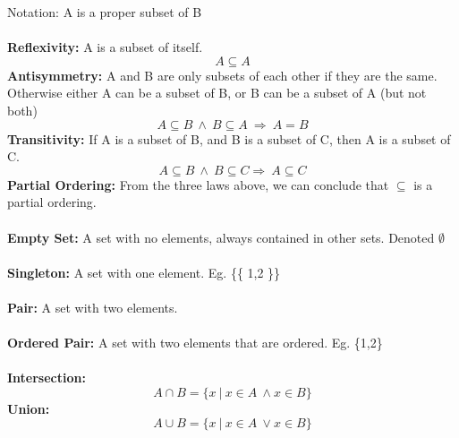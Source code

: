 \documentclass[a4paper,10pt]{article}
\begin{document}
\textcolor{BlueGreen}{Notation:} A is a proper subset of B \\\\
\textcolor{BlueGreen}{\textbf{Reflexivity:}} A is a subset of itself. \\
\begin{equation*}
A \subseteq A
\end{equation*}
\newline
\textcolor{BlueGreen}{\textbf{Antisymmetry:}} A and B are only subsets of each other if they are the same. Otherwise either A can be a subset of B, or B can be a subset of A (but not both) \\
\begin{equation*}
A \subseteq B \ \land \ B \subseteq A \ \Rightarrow \ A = B
\end{equation*}
\newline
\textcolor{BlueGreen}{\textbf{Transitivity:}} If A is a subset of B, and B is a subset of C, then A is a subset of C.  \\
\begin{equation*}
A \subseteq B \ \land \  B \subseteq C \Rightarrow \ A \subseteq C
\end{equation*}
\newline
\textcolor{BlueGreen}{\textbf{Partial Ordering:}} From the three laws above, we can conclude that $\subseteq$ is a partial ordering. \\\\
\textcolor{BlueGreen}{\textbf{Empty Set:}} A set with no elements, always contained in other sets. Denoted $\emptyset$ \\\\
\textcolor{BlueGreen}{\textbf{Singleton:}} A set with one element. Eg. \{\{ 1,2 \}\} \\\\
\textcolor{BlueGreen}{\textbf{Pair:}} A set with two elements. \\\\
\textcolor{BlueGreen}{\textbf{Ordered Pair:}} A set with two elements that are ordered. Eg. \{1,2\} \\\\
\textcolor{BlueGreen}{\textbf{Intersection:}} \\
\begin{equation*}
A \cap B = \{x \ |\  x \in A \ \land x \in B \}
\end{equation*}
\newline
\textcolor{BlueGreen}{\textbf{Union:}} \\
\begin{equation*}
A \cup B = \{ x \ |  \ x \in A \ \lor x \in B\}
\end{equation*}
\end{document}
